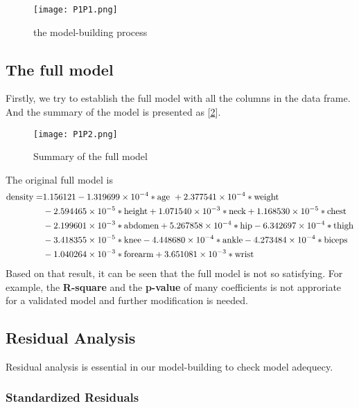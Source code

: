 \documentclass[11pt]{article}
\begin{document}
\begin{figure}[!htb]
\centering
\texttt{[image: P1P1.png]}
\caption{the model-building process}\label{Fig1}
\end{figure}


\subsection{The full model} \label{ch1}

Firstly, we try to establish the full model with all the columns in the data frame. And the summary of the model is presented as [\ref{Fig2}].


\begin{figure}[!htb]
\centering
\texttt{[image: P1P2.png]}
\caption{Summary of the full model}\label{Fig2}
\end{figure}

The original full model is 
\begin{align}
	\text{density} = &1.156121-1.319699\times10^{-4} *\text{age }+2.377541\times10^{-4}*\text{weight}\notag\\
	&-2.594465\times10^{-5}*\text{height}+1.071540\times10^{-3}*\text{neck} +1.168530\times10^{-5}*\text{chest}\notag\\
	&-2.199601\times10^{-3}*\text{abdomen}+5.267858\times10^{-4}*\text{hip}-6.342697\times10^{-4}*\text{thigh}\notag \\ 
    &-3.418355\times10^{-5}*\text{knee} -4.448680\times10^{-4}*\text{ankle}-4.273484\times10^{-4}*\text{biceps}\notag\\
    & -1.040264\times10^{-3}*\text{forearm}+3.651081\times10^{-3}*\text{wrist}\label{eq1}    
\end{align}
Based on that result, it can be seen that the full model is not so satisfying. For example, the {\bf R-square} and the {\bf p-value} of many coefficients is not approriate for a validated model and further modification is needed.



\subsection{Residual Analysis}\label{ch2}

Residual analysis is essential in our model-building to check model adequecy.

\subsubsection{Standardized Residuals}
\end{document}
